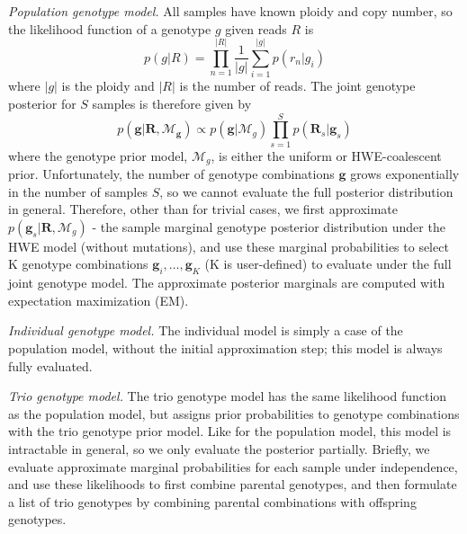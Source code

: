 \documentclass[notitlepage, twocolumn, 10pt]{article}
\begin{document}
\vspace{3mm}
\noindent\emph{Population genotype model.} All samples have known ploidy and copy number, so the likelihood function of a genotype $g$ given reads $R$ is
\begin{equation*}
	p(g | R) = \prod_{n=1}^{|R|} \frac{1}{|g|} \sum_{i = 1}^{|g|} p(r_n | g_{i})
\end{equation*}
where $|g|$ is the ploidy and $|R|$ is the number of reads. The joint genotype posterior for $S$ samples is therefore given by
\begin{equation*}
	p(\boldsymbol{g} | \boldsymbol{R}, \mathcal{M}_{\boldsymbol{g}}) \propto p(\boldsymbol{g} | \mathcal{M}_g) \prod_{s=1}^S p(\boldsymbol{R}_s | \boldsymbol{g}_s)
\end{equation*}
where the genotype prior model, $\mathcal{M}_g$, is either the uniform or HWE-coalescent prior. Unfortunately, the number of genotype combinations $\boldsymbol{g}$ grows exponentially in the number of samples $S$, so we cannot evaluate the full posterior distribution in general. Therefore, other than for trivial cases, we first approximate $p(\boldsymbol{g}_s | \boldsymbol{R}, \mathcal{M}_g)$ - the sample marginal genotype posterior distribution under the HWE model (without mutations), and use these marginal probabilities to select K genotype combinations $\boldsymbol{g}_i, \dots, \boldsymbol{g}_K$ (K is user-defined) to evaluate under the full joint genotype model. The approximate posterior marginals are computed with expectation maximization (EM).

\vspace{3mm}
\noindent\emph{Individual genotype model.} The individual model is simply a case of the population model, without the initial approximation step; this model is always fully evaluated.

\vspace{3mm}
\noindent\emph{Trio genotype model.} The trio genotype model has the same likelihood function as the population model, but assigns prior probabilities to genotype combinations with the trio genotype prior model. Like for the population model, this model is intractable in general, so we only evaluate the posterior partially. Briefly, we evaluate approximate marginal probabilities for each sample under independence, and use these likelihoods to first combine parental genotypes, and then formulate a list of trio genotypes by combining parental combinations with offspring genotypes.
\end{document}
